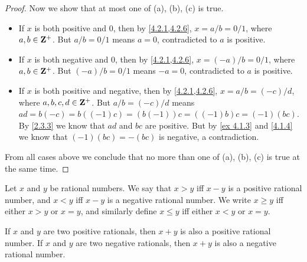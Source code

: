 \begin{proof}
  Now we show that at most one of (a), (b), (c) is true.
  \begin{itemize}
    \item If \(x\) is both positive and \(0\), then by \cref{4.2.1,4.2.6}, \(x = a / b = 0 / 1\), where \(a, b \in \mathbf{Z}^+\).
          But \(a / b = 0 / 1\) means \(a = 0\), contradicted to \(a\) is positive.
    \item If \(x\) is both negative and \(0\), then by \cref{4.2.1,4.2.6}, \(x = (-a) / b = 0 / 1\), where \(a, b \in \mathbf{Z}^+\).
          But \((-a) / b = 0 / 1\) means \(-a = 0\), contradicted to \(a\) is positive.
    \item If \(x\) is both positive and negative, then by \cref{4.2.1,4.2.6}, \(x = a / b = (-c) / d\), where \(a, b, c, d \in \mathbf{Z}^+\).
          But \(a / b = (-c) / d\) means \(ad = b(-c) = b((-1)c) = (b(-1))c = ((-1)b)c = (-1)(bc)\).
          By \cref{2.3.3} we know that \(ad\) and \(bc\) are positive.
          But by \cref{ex 4.1.3} and \cref{4.1.4} we know that \((-1)(bc) = -(bc)\) is negative, a contradiction.
  \end{itemize}
  From all cases above we conclude that no more than one of (a), (b), (c) is true at the same time.
\end{proof}

\begin{definition}\label{4.2.8}
  Let \(x\) and \(y\) be rational numbers.
  We say that \(x > y\) iff \(x - y\) is a positive rational number, and \(x < y\) iff \(x - y\) is a negative rational number.
  We write \(x \geq y\) iff either \(x > y\) or \(x = y\), and similarly define \(x \leq y\) iff either \(x < y\) or \(x = y\).
\end{definition}

\begin{additional corollary}\label{ac 4.2.4}
If \(x\) and \(y\) are two positive rationals, then \(x + y\) is also a positive rational number.
If \(x\) and \(y\) are two negative rationals, then \(x + y\) is also a negative rational number.
\end{additional corollary}

